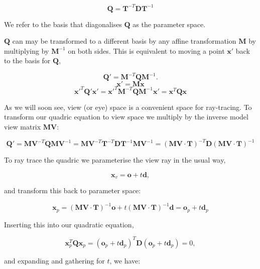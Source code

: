 \documentclass[11pt]{article}
\renewcommand{\v}[1]{\ensuremath{\mathbf{#1}}} %
\begin{document}
\begin{equation}
\v{Q}= \v{T}^{-T}\v{D}\v{T}^{-1}
\end{equation}

We refer to the basis that diagonalises $\v{Q}$ as the parameter space.

$\v{Q}$ can may be transformed to a different basis by any affine transformation $\v{M}$ by multiplying by $\v{M}^{-1}$ on both sides. This is equivalent to moving a point $\v{x}'$ back to the basis for $\v{Q}$, 

\begin{equation}
\v{Q'} = \v{M}^{-T}\v{Q}\v{M}^{-1}.
\end{equation}
%
\begin{equation}
\v{x}' = \v{M}\v{x}
\end{equation}
%
\begin{equation}
\v{x'}^T\v{Q'}\v{x'} = \v{x'}^T\v{M}^{-T}\v{Q}\v{M}^{-1}\v{x'} = \v{x}^T\v{Q}\v{x}
\end{equation}

As we will soon see, view (or eye) space is a convenient space for ray-tracing. To transform our quadric equation to view space we multiply by the inverse model view matrix $\v{MV}$:

\begin{equation}
\v{Q'} = \v{MV}^{-T}\v{Q}\v{MV}^{-1} = \v{MV}^{-T}\v{T}^{-T}\v{D}\v{T}^{-1}\v{MV}^{-1} = (\v{MV}\cdot\v{T})^{-T}\v{D}(\v{MV}\cdot\v{T})^{-1}
\end{equation}

To ray trace the quadric we parameterise the view ray in the usual way,

\begin{equation}
\v{x}_v = \v{o} + t\v{d},
\end{equation}

and transform this back to parameter space:

\begin{equation}
\v{x}_p = (\v{MV}\cdot\v{T})^{-1}\v{o} + t(\v{MV}\cdot\v{T})^{-1}\v{d} = \v{o}_p + t\v{d}_p
\end{equation}

Inserting this into our quadratic equation,

\begin{equation}
\v{x}^T_p\v{Q}\v{x}_p = (\v{o}_p + t\v{d}_p)^T\v{D}(\v{o}_p + t\v{d}_p) = 0,
\end{equation}

and expanding and gathering for $t$, we have:
\end{document}
